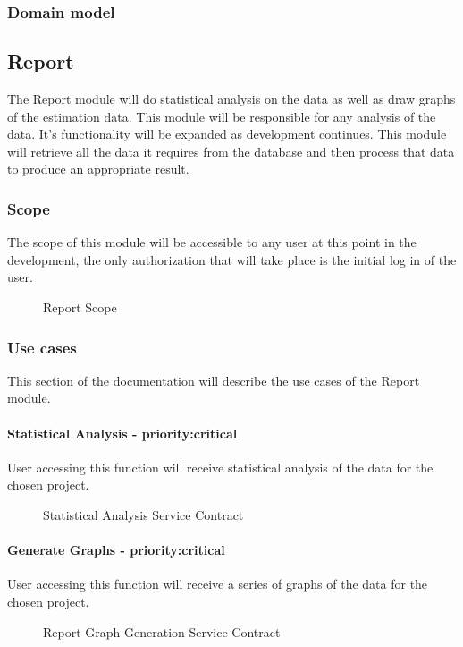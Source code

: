 \subsubsection{Domain model}
\subsection{Report}
The Report module will do statistical analysis on the data as well as draw graphs of the estimation data. This module will be responsible for any analysis of the data. It's functionality will be expanded as development continues. This module will retrieve all the data it requires from the database and then process that data to produce an appropriate result.
\subsubsection{Scope}
The scope of this module will be accessible to any user at this point in the development, the only authorization that will take place is the initial log in of the user.
	\begin{figure}[H]
	    	\centering
	    	\caption{Report Scope}
	    	\label{fig:Report_Scope.png}
   	\end{figure}
\subsubsection{Use cases}
	This section of the documentation will describe the use cases of the Report module.
	\paragraph{Statistical Analysis - priority:critical}
	User accessing this function will receive statistical analysis of the data for the chosen project.
	\begin{figure}[H]
	    	\centering
	    	\caption{Statistical Analysis Service Contract}
	    	\label{fig:Report_getStatistics.png Contract}
   	\end{figure}
	\paragraph{Generate Graphs - priority:critical}
	User accessing this function will receive a series of graphs of the data for the chosen project. 
	\begin{figure}[H]
	    	\centering
	    	\caption{Report Graph Generation Service Contract}
	    	\label{fig:Report_GraphGeneration.png Contract}
   	\end{figure}

